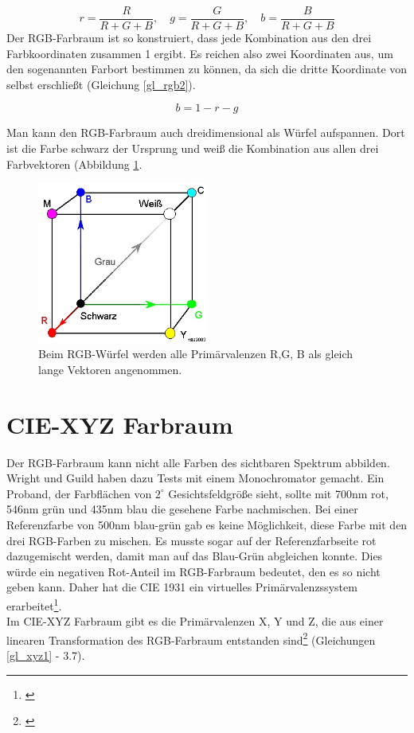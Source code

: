 \begin{equation}\label{gl_rgb1}
		r = \frac{R}{R+G+B},\quad g = \frac{G}{R+G+B},\quad b = \frac{B}{R+G+B}
\end{equation}
Der RGB-Farbraum ist so konstruiert, dass jede Kombination aus den drei Farbkoordinaten zusammen 1 ergibt. Es reichen also zwei Koordinaten aus, um den sogenannten Farbort bestimmen zu können, da sich die dritte Koordinate von selbst erschließt (Gleichung \ref{gl_rgb2}). 

\begin{equation}\label{gl_rgb2}
		b=1-r-g
\end{equation}

Man kann den RGB-Farbraum auch dreidimensional als Würfel aufspannen. Dort ist die Farbe schwarz der Ursprung und weiß die Kombination aus allen drei Farbvektoren (Abbildung \ref{b_rgb1}.

\begin{figure}[H]     %
\centering
\includegraphics[width=0.5\textwidth]{bilder/rgb1} 
\caption {Beim RGB-Würfel werden alle Primärvalenzen R,G, B als gleich lange Vektoren angenommen.\protect\footnotemark}\label{b_rgb1}
\end{figure}

 

\section{CIE-XYZ Farbraum} \label{sec_xyz}

Der RGB-Farbraum kann nicht alle Farben des sichtbaren Spektrum abbilden. Wright und Guild haben dazu Tests mit einem Monochromator gemacht. Ein Proband, der Farbflächen von $2^\circ$  Gesichtsfeldgröße sieht, sollte mit 700nm rot, 546nm grün und 435nm blau die gesehene Farbe nachmischen. Bei einer Referenzfarbe von 500nm blau-grün gab es keine Möglichkeit, diese Farbe mit den drei RGB-Farben zu mischen. Es musste sogar auf der Referenzfarbseite rot dazugemischt werden, damit man auf das Blau-Grün abgleichen konnte. Dies würde ein negativen Rot-Anteil im RGB-Farbraum bedeutet, den es so nicht geben kann. Daher hat die CIE 1931 ein virtuelles Primärvalenzssystem erarbeitet\footnote{\cite[77]{greule}}.\\
Im CIE-XYZ Farbraum gibt es die Primärvalenzen X, Y und Z, die aus einer linearen Transformation des RGB-Farbraum entstanden sind\footnote{\cite[76-77]{greule}} (Gleichungen  \ref{gl_xyz1} - 3.7).

